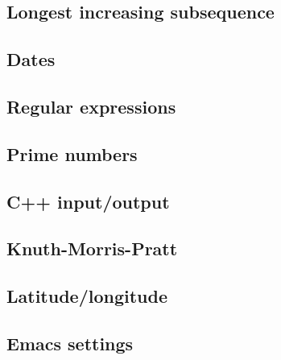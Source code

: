 \documentclass[twocolumn]{article}
\begin{document}
\subsection{Longest increasing subsequence}

\subsection{Dates}

\subsection{Regular expressions}

\subsection{Prime numbers}

\subsection{C++ input/output}

\subsection{Knuth-Morris-Pratt}

\subsection{Latitude/longitude}

\subsection{Emacs settings}

\end{document}

